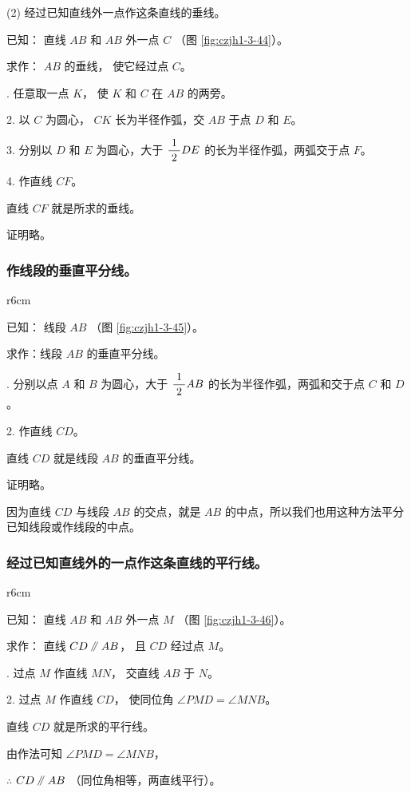 \begin{enhancedline}
(2) 经过已知直线外一点作这条直线的垂线。

已知： 直线 $AB$ 和 $AB$ 外一点 $C$ （图 \ref{fig:czjh1-3-44}）。

求作： $AB$ 的垂线， 使它经过点 $C$。

. 任意取一点 $K$， 使 $K$ 和 $C$ 在 $AB$ 的两旁。

2. 以 $C$ 为圆心， $CK$ 长为半径作弧，交 $AB$ 于点 $D$ 和 $E$。

3. 分别以 $D$ 和 $E$ 为圆心，大于 $\dfrac{\; 1 \;}{2} DE$ 的长为半径作弧，两弧交于点 $F$。

4. 作直线 $CF$。

直线 $CF$ 就是所求的垂线。

证明略。


\subsubsection{作线段的垂直平分线。}

\begin{wrapfigure}[8]{r}{6cm}
  \centering
  
  \caption{}\label{fig:czjh1-3-45}
\end{wrapfigure}


已知： 线段 $AB$ （图 \ref{fig:czjh1-3-45}）。

求作：线段 $AB$ 的垂直平分线。

. 分别以点 $A$ 和 $B$ 为圆心，大于 $\dfrac{\; 1 \;}{2} AB$ 的长为半径作弧，两弧和交于点 $C$ 和 $D$。

2. 作直线 $CD$。

直线 $CD$ 就是线段 $AB$ 的垂直平分线。

证明略。

因为直线 $CD$ 与线段 $AB$ 的交点，就是 $AB$ 的中点，所以我们也用这种方法平分已知线段或作线段的中点。


\subsubsection{经过已知直线外的一点作这条直线的平行线。}

\begin{wrapfigure}[6]{r}{6cm}
  \centering
  
  \caption{}\label{fig:czjh1-3-46}
\end{wrapfigure}


已知： 直线 $AB$ 和 $AB$ 外一点 $M$ （图 \ref{fig:czjh1-3-46}）。

求作： 直线 $CD \pingxing AB$， 且 $CD$ 经过点 $M$。

. 过点 $M$ 作直线 $MN$， 交直线 $AB$ 于 $N$。

2. 过点 $M$ 作直线 $CD$， 使同位角 $\angle PMD = \angle MNB$。

直线 $CD$ 就是所求的平行线。

\zhengming 由作法可知 $\angle PMD = \angle MNB$，

$\therefore$ \quad $CD \pingxing AB$ （同位角相等，两直线平行）。

\end{enhancedline}
\endgroup

